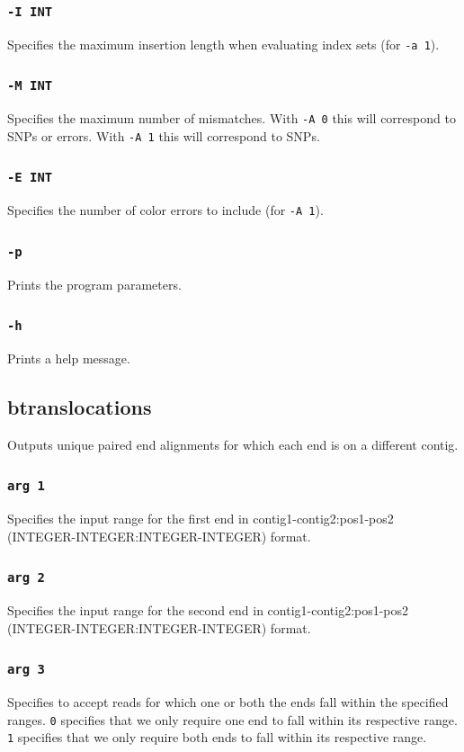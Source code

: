 \documentclass[a4paper,12pt]{book}
\newcommand{\TT}[1]{{\tt #1}} %
\begin{document}
\subsubsection{\TT{-I INT}}
Specifies the maximum insertion length when evaluating index sets (for \TT{-a 1}).
\subsubsection{\TT{-M INT}}
Specifies the maximum number of mismatches.
With \TT{-A 0} this will correspond to SNPs or errors.
With \TT{-A 1} this will correspond to SNPs.
\subsubsection{\TT{-E INT}}
Specifies the number of color errors to include (for \TT{-A 1}).
\subsubsection{\TT{-p}}
Prints the program parameters.
\subsubsection{\TT{-h}}
Prints a help message.
\subsection{btranslocations}
\label{sec:btranslocations}
Outputs unique paired end alignments for which each end is on a different contig.
\subsubsection{\TT{arg 1}}
Specifies the input range for the first end in contig1-contig2:pos1-pos2 (INTEGER-INTEGER:INTEGER-INTEGER) format.
\subsubsection{\TT{arg 2}}
Specifies the input range for the second end in contig1-contig2:pos1-pos2 (INTEGER-INTEGER:INTEGER-INTEGER) format.
\subsubsection{\TT{arg 3}}
Specifies to accept reads for which one or both the ends fall within the specified ranges.
\TT{0} specifies that we only require one end to fall within its respective range.
\TT{1} specifies that we only require both ends to fall within its respective range.
\end{document}
